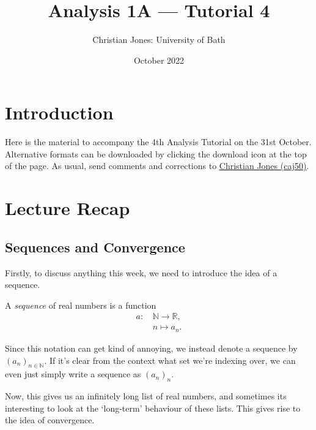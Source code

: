 \documentclass[
  17pt,
  a4paper]{extarticle}
\title{Analysis 1A --- Tutorial 4}
\author{Christian Jones: University of Bath}
\date{October 2022}
\theoremstyle{plain}
\theoremstyle{definition}
\theoremstyle{plain}
\theoremstyle{plain}
\theoremstyle{plain}
\theoremstyle{plain}
\theoremstyle{definition}
\theoremstyle{definition}
\theoremstyle{remark}
\theoremstyle{remark}
\let\BeginKnitrBlock\begin \let\EndKnitrBlock\end
\renewcommand{\;}{\,}
\begin{document}
\maketitle

{
\setcounter{tocdepth}{2}
\tableofcontents
}
\newpage
{}

\hypertarget{introduction}{%
\section*{Introduction}\label{introduction}}

Here is the material to accompany the 4th Analysis Tutorial on the 31st October. Alternative formats can be downloaded by clicking the download icon at the top of the page. As usual, send comments and corrections to \href{mailto:caj50@bath.ac.uk}{Christian Jones (caj50)}.

\hypertarget{lecture-recap}{%
\section{Lecture Recap}\label{lecture-recap}}

\hypertarget{sequences-and-convergence}{%
\subsection{Sequences and Convergence}\label{sequences-and-convergence}}

Firstly, to discuss anything this week, we need to introduce the idea of a sequence.
\BeginKnitrBlock{definition}[Sequence]
{\label{def:def1} }A \emph{sequence} of real numbers is a function
\begin{align*}
    a:\; &\mathbb{N} \longrightarrow \mathbb{R},\\
    &n \longmapsto a_n.
\end{align*}
\EndKnitrBlock{definition}
Since this notation can get kind of annoying, we instead denote a sequence by \((a_n)_{n\in\mathbb{N}}\). If it's clear from the context what set we're indexing over, we can even just simply write a sequence as \((a_n)_n\).

Now, this gives us an infinitely long list of real numbers, and sometimes its interesting to look at the `long-term' behaviour of these lists. This gives rise to the idea of convergence.
\end{document}
